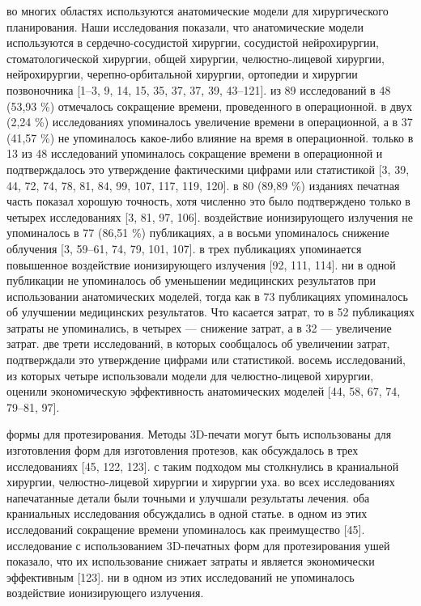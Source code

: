 во многих областях используются анатомические модели для хирургического
планирования. Наши исследования показали, что анатомические модели используются
в сердечно-сосудистой хирургии, сосудистой нейрохирургии, стоматологической
хирургии, общей хирургии, челюстно-лицевой хирургии, нейрохирургии,
черепно-орбитальной хирургии, ортопедии и хирургии позвоночника [1–3, 9, 14, 15,
35, 37, 37, 39, 43–121]. из 89 исследований в 48 (53,93 \%) отмечалось сокращение
времени, проведенного в операционной. в двух (2,24 \%) исследованиях
упоминалось увеличение времени в операционной, а в 37 (41,57 \%) не
упоминалось какое-либо влияние на время в операционной. только в 13 из 48
исследований упоминалось сокращение времени в операционной и подтверждалось
это утверждение фактическими цифрами или статистикой [3, 39, 44, 72, 74, 78,
81, 84, 99, 107, 117, 119, 120]. в 80 (89,89 \%) изданиях печатная часть
показал хорошую точность, хотя численно это было подтверждено только в четырех
исследованиях [3, 81, 97, 106]. воздействие ионизирующего излучения не
упоминалось в 77 (86,51 \%) публикациях, а в восьми упоминалось снижение
облучения [3, 59–61, 74, 79, 101, 107]. в трех публикациях упоминается
повышенное воздействие ионизирующего излучения [92, 111, 114]. ни в одной
публикации не упоминалось об уменьшении медицинских результатов при
использовании анатомических моделей, тогда как в 73 публикациях упоминалось об
улучшении медицинских результатов. Что касается затрат, то в 52 публикациях
затраты не упоминались, в четырех — снижение затрат, а в 32 — увеличение затрат.
две трети исследований, в которых сообщалось об увеличении затрат, подтверждали
это утверждение цифрами или статистикой. восемь исследований, из которых четыре
использовали модели для челюстно-лицевой хирургии, оценили экономическую
эффективность анатомических моделей [44, 58, 67, 74, 79–81, 97].

формы для протезирования. Методы 3D-печати могут быть использованы для
изготовления форм для изготовления протезов, как обсуждалось в трех
исследованиях [45, 122, 123]. с таким подходом мы столкнулись в краниальной
хирургии, челюстно-лицевой хирургии и хирургии уха. во всех исследованиях
напечатанные детали были точными и улучшали результаты лечения. оба краниальных
исследования обсуждались в одной статье. в одном из этих исследований сокращение
времени упоминалось как преимущество [45]. исследование с использованием
3D-печатных форм для протезирования ушей показало, что их использование снижает
затраты и является экономически эффективным [123]. ни в одном из этих
исследований не упоминалось воздействие ионизирующего излучения.

